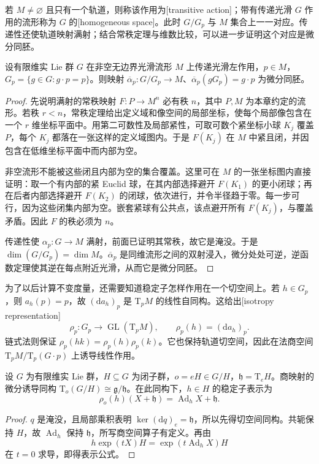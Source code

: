 \ProseParagraphBreak

若 \(M\ne\varnothing\) 且只有一个轨道，则称该作用为[transitive action]；带有传递光滑 \(G\) 作用的流形称为 \(G\) 的[homogeneous space]。此时 \(G/G_p\) 与 \(M\) 集合上一一对应。传递性还使轨道映射满射；结合常秩定理与维数比较，可以进一步证明这个对应是微分同胚。

\begin{proposition}\label{g1:prop:transitive-action-model}
	设有限维实 Lie 群 \(G\) 在非空无边界光滑流形 \(M\) 上传递光滑左作用，\(p\in M\)，\(G_p=\{g\in G:g\cdot p=p\}\)。则映射 \(\overline\alpha_p:G/G_p\to M\)、\(\overline\alpha_p(gG_p)=g\cdot p\) 为微分同胚。
\end{proposition}
\begin{proof}
	先说明满射的常秩映射 \(F:P\to M^n\) 必有秩 \(n\)，其中 \(P,M\) 为本章约定的流形。若秩 \(r<n\)，常秩定理给出定义域和像空间的局部坐标，使每个局部像包含在一个 \(r\) 维坐标平面中。用第二可数性及局部紧性，可取可数个紧坐标小球 \(K_j\) 覆盖 \(P\)，每个 \(K_j\) 都落在一张这样的定义域图内。于是 \(F(K_j)\) 在 \(M\) 中紧且闭，并因包含在低维坐标平面中而内部为空。

	非空流形不能被这些闭且内部为空的集合覆盖。这里可在 \(M\) 的一张坐标图内直接证明：取一个有内部的紧 Euclid 球，在其内部选择避开 \(F(K_1)\) 的更小闭球；再在后者内部选择避开 \(F(K_2)\) 的闭球，依次进行，并令半径趋于零。每一步可行，因为这些闭集内部为空。嵌套紧球有公共点，该点避开所有 \(F(K_j)\)，与覆盖矛盾。因此 \(F\) 的秩必须为 \(n\)。

	传递性使 \(\alpha_p:G\to M\) 满射，前面已证明其常秩，故它是淹没。于是 \(\dim(G/G_p)=\dim M\)。\(\overline\alpha_p\) 是同维流形之间的双射浸入，微分处处可逆，逆函数定理使其逆在每点附近光滑，从而它是微分同胚。
\end{proof}

为了以后计算不变度量，还需要知道稳定子怎样作用在一个切空间上。若 \(h\in G_p\)，则 \(a_h(p)=p\)，故 \((\mathrm{d}a_h)_p\) 是 \(\mathrm{T}_pM\) 的线性自同构。这给出[isotropy representation]
\[
	\rho_p:G_p\longrightarrow\operatorname{GL}(\mathrm{T}_pM),\qquad
	\rho_p(h)=(\mathrm{d}a_h)_p.
\]
链式法则保证 \(\rho_p(hk)=\rho_p(h)\rho_p(k)\)。它也保持轨道切空间，因此在法商空间 \(\mathrm{T}_pM/\mathrm{T}_p(G\cdot p)\) 上诱导线性作用。

\begin{proposition}\label{g1:prop:homogeneous-tangent-isotropy}
	设 \(G\) 为有限维实 Lie 群，\(H\subseteq G\) 为闭子群，\(o=eH\in G/H\)，\(\mathfrak h=\mathrm{T}_eH\)。商映射的微分诱导同构 \(\mathrm{T}_o(G/H)\cong\mathfrak g/\mathfrak h\)。在此同构下，\(h\in H\) 的稳定子表示为
	\[
		\rho_o(h)(X+\mathfrak h)=\operatorname{Ad}_hX+\mathfrak h.
	\]
\end{proposition}
\begin{proof}
	\(q\) 是淹没，且局部乘积表明 \(\ker(\mathrm{d}q)_e=\mathfrak h\)，所以先得切空间同构。共轭保持 \(H\)，故 \(\operatorname{Ad}_h\) 保持 \(\mathfrak h\)，所写商空间算子有定义。再由
	\[
		h\exp(tX)H=\exp(t\operatorname{Ad}_hX)H
	\]
	在 \(t=0\) 求导，即得表示公式。
\end{proof}

